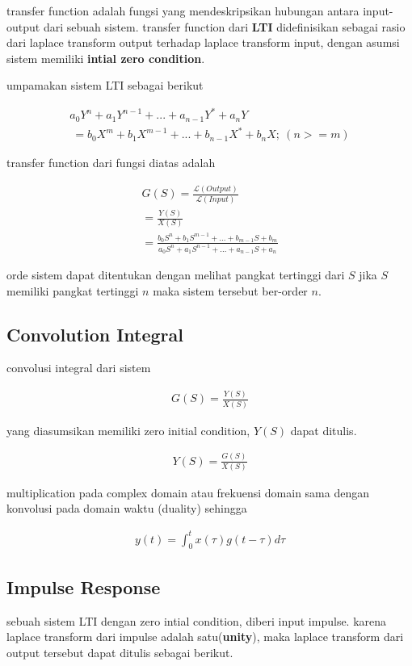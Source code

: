 transfer function adalah fungsi yang mendeskripsikan hubungan antara input-output dari sebuah sistem.
transfer function dari \textbf{LTI} didefinisikan sebagai rasio dari laplace transform output terhadap laplace
transform input, dengan asumsi sistem memiliki \textbf{intial zero condition}.

umpamakan sistem LTI sebagai berikut 

\begin{multline*}
  a_0Y^n + a_1Y^{n-1} + ... + a_{n-1}Y^* + a_nY\\ 
  \: = b_0X^m + b_1X^{m-1} + ... + b_{n-1}X^* +b_nX ; \: (n>=m)
\end{multline*}

transfer function dari fungsi diatas adalah

\begin{gather}
  G(S) = \frac{\mathcal{L}(Output)}{\mathcal{L}(Input)}\\
  =\frac{Y(S)}{X(S)}\\
  =\frac{b_0S^n + b_1S^{m-1} + ... + b_{m-1}S + b_m}
        {a_0S^n + a_1S^{n-1} + ... + a_{n-1}S + a_n}
\end{gather}

orde sistem dapat ditentukan dengan melihat pangkat tertinggi dari $S$ jika $S$ memiliki pangkat tertinggi $n$
maka sistem tersebut ber-order $n$.

\subsection{Convolution Integral}
convolusi integral dari sistem 

\begin{gather}
  G(S)=\frac{Y(S)}{X(S)}
\end{gather}

yang diasumsikan memiliki zero initial condition, $Y(S)$ dapat ditulis.

\begin{gather}
  Y(S)=\frac{G(S)}{X(S)}
\end{gather}

multiplication pada complex domain atau frekuensi domain sama dengan konvolusi pada domain waktu (duality)
sehingga 


\begin{gather}
  y(t) = \int_{0}^{t} x(\tau) g(t-\tau) d\tau
\end{gather}


\subsection{Impulse Response}
sebuah sistem LTI dengan zero intial condition, diberi input impulse. karena laplace transform dari impulse
adalah satu(\textbf{unity}), maka laplace transform dari output tersebut dapat ditulis sebagai berikut.

